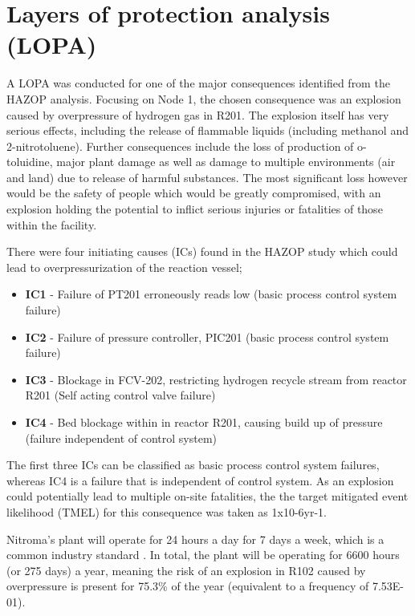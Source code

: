 \section{Layers of protection analysis (LOPA)}

A LOPA was conducted for one of the major consequences identified from the HAZOP analysis. Focusing on Node 1, the chosen consequence was an explosion caused by overpressure of hydrogen gas in R201. The explosion itself has very serious effects, including the release of flammable liquids (including methanol and 2-nitrotoluene). Further consequences include the loss of production of o-toluidine, major plant damage as well as damage to multiple environments (air and land) due to release of harmful substances. The most significant loss however would be the safety of people which would be greatly compromised, with an explosion holding the potential to inflict serious injuries or fatalities of those within the facility. 

There were four initiating causes (ICs) found in the HAZOP study which could lead to overpressurization of the reaction vessel;

\begin{itemize}
\item \textbf{IC1} - Failure of PT201 erroneously reads low  (basic process control system failure)
\item \textbf{IC2} - Failure of pressure controller, PIC201 (basic process control system failure)
\item \textbf{IC3 }- Blockage in FCV-202, restricting hydrogen recycle stream from reactor R201 (Self acting control valve failure)
\item \textbf{IC4} - Bed blockage within in reactor R201, causing build up of pressure (failure independent of control system)
\end{itemize}

The first three ICs can be classified as basic process control system failures, whereas IC4 is a failure that is independent of control system. As an explosion could potentially lead to multiple on-site fatalities, the the target mitigated event likelihood (TMEL) for this consequence was taken as 1x10-6yr-1. 


Nitroma's plant will operate for 24 hours a day for 7 days a week, which is a common industry standard \cite{job_guide_chemical_2021}. In total, the plant will be operating for 6600 hours (or 275 days) a year, meaning the risk of an explosion in R102 caused by overpressure is present for 75.3\% of the year (equivalent to a frequency of 7.53E-01).  
 
